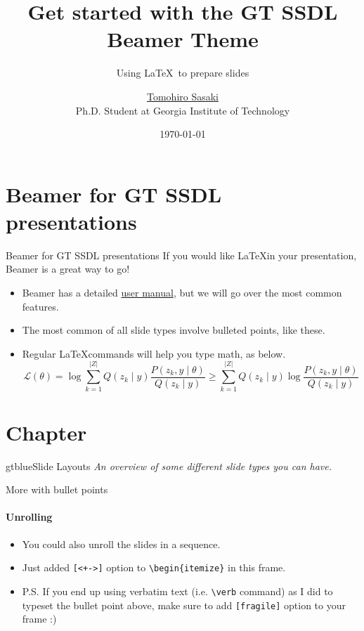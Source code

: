 \documentclass{beamer}
\title{Get started with the GT SSDL Beamer Theme}
\subtitle{Using \LaTeX\ to prepare slides}
\author{\href{mailto:tomohiro.sasaki@gatech.edu}{Tomohiro Sasaki}\\Ph.D. Student at Georgia Institute of Technology}
\date{\today}
\newcommand{\hrefcol}[2]{\textcolor{gtbuzzgold}{\href{#1}{#2}}}
\begin{document}
\maketitle


\frame{\vspace{-15mm}\tableofcontents[hideallsubsections]}

\section{Beamer for GT SSDL presentations}

\begin{frame}{Beamer for GT SSDL presentations}
If you would like \LaTeX in your presentation, Beamer is a great way to go!
\begin{itemize}
\item Beamer has a detailed
\hrefcol{https://www.ctan.org/tex-archive/macros/latex/contrib/beamer/doc/beameruserguide.pdf}{user
 manual}, but we will go over the most common features.
\item The most common of all slide types involve bulleted points, like these.
\item Regular \LaTeX commands will help you type math, as below\footnotemark.
\begin{equation*}
\mathcal{L} (\theta) = \log \sum_{k=1}^{\lvert Z \rvert} Q(z_k \mid y) \frac{P( z_k,  y \mid \theta)}{Q(z_k \mid y)} \geq \sum_{k=1}^{\lvert Z \rvert} Q(z_k \mid y) \log \frac{P( z_k,  y \mid \theta)}{Q(z_k \mid y)}
\end{equation*}
\end{itemize}
\end{frame}


\section{Chapter}
\begin{chapter}{gtblue}{Slide Layouts}
\textit{An overview of some different slide types you can have.}
\end{chapter}


\begin{frame}[fragile]{More with bullet points}
\framesubtitle{Unrolling}
\begin{itemize}[<+->]
\item You could also unroll the slides in a sequence.
\item Just added \verb|[<+->]| option to \verb|\begin{itemize}| in this frame.
\item P.S. If you end up using verbatim text (i.e. \verb|\verb| command) as I did to typeset the bullet point above, make sure to add \verb|[fragile]| option to your frame :)
\end{itemize}
\end{frame}
\end{document}
